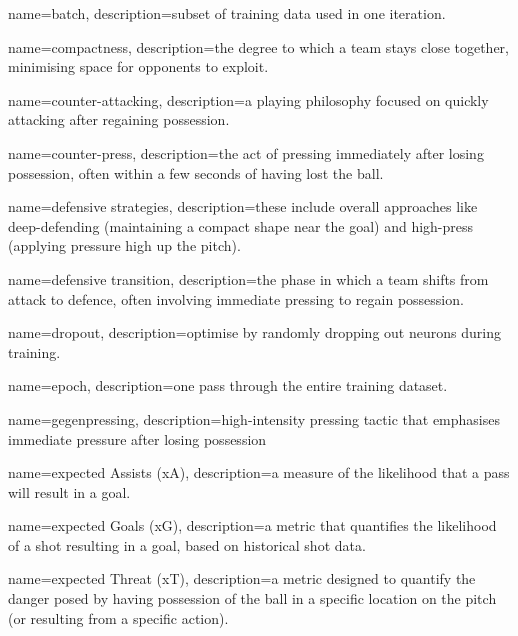 



{
    name=batch,
    description={subset of training data used in one iteration.}
}

{
    name=compactness,
    description={the degree to which a team stays close together, minimising space for opponents to exploit.}
}

{
    name=counter-attacking,
    description={a playing philosophy focused on quickly attacking after regaining possession.}
}

{
    name=counter-press,
    description={the act of pressing immediately after losing possession, often within a few seconds of having lost the ball.}
}

{
    name=defensive strategies,
    description={these include overall approaches like deep-defending (maintaining a compact shape near the goal) and high-press (applying pressure high up the pitch).}
}

{
    name=defensive transition,
    description={the phase in which a team shifts from attack to defence, often involving immediate pressing to regain possession.}
}

{
    name=dropout,
    description={optimise by randomly dropping out neurons during training.}
}

{
    name=epoch,
    description={one pass through the entire training dataset.}
}

{
    name=gegenpressing,
    description={high-intensity pressing tactic that emphasises immediate pressure after losing possession}
}

{
    name=expected Assists (xA),
    description={a measure of the likelihood that a pass will result in a goal.}
}

{
    name=expected Goals (xG),
    description={a metric that quantifies the likelihood of a shot resulting in a goal, based on historical shot data.}
}

{
    name=expected Threat (xT),
    description={a metric designed to quantify the danger posed by having possession of the ball in a specific location on the pitch (or resulting from a specific action).}
}

